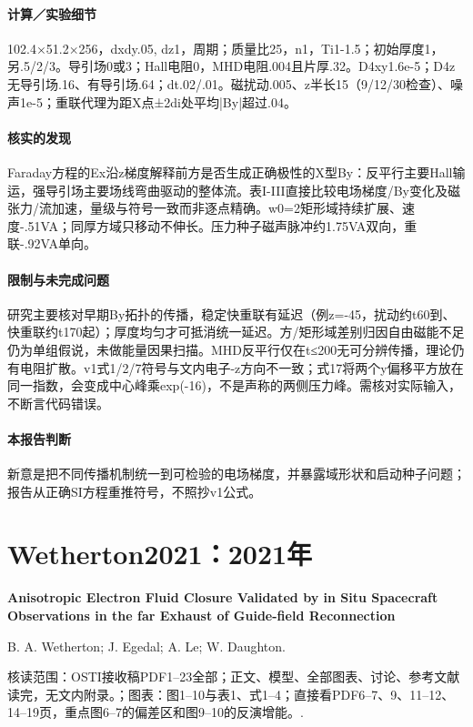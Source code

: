\documentclass[UTF8,a4paper,11pt,openany,fontset=fandol]{ctexbook}
\begin{document}
\paragraph{计算／实验细节}102.4×51.2×256，dxdy.05, dz1，周期；质量比25，n1，Ti1-1.5；初始厚度1，另.5/2/3。导引场0或3；Hall电阻0，MHD电阻.004且片厚.32。D4xy1.6e-5；D4z无导引场.16、有导引场.64；dt.02/.01。磁扰动.005、z半长15（9/12/30检查）、噪声1e-5；重联代理为距X点±2di处平均|By|超过.04。

\paragraph{核实的发现}Faraday方程的Ex沿z梯度解释前方是否生成正确极性的X型By：反平行主要Hall输运，强导引场主要场线弯曲驱动的整体流。表I-III直接比较电场梯度/By变化及磁张力/流加速，量级与符号一致而非逐点精确。w0=2矩形域持续扩展、速度-.51VA；同厚方域只移动不伸长。压力种子磁声脉冲约1.75VA双向，重联-.92VA单向。

\paragraph{限制与未完成问题}研究主要核对早期By拓扑的传播，稳定快重联有延迟（例z=-45，扰动约t60到、快重联约t170起）；厚度均匀才可抵消统一延迟。方/矩形域差别归因自由磁能不足仍为单组假说，未做能量因果扫描。MHD反平行仅在t≤200无可分辨传播，理论仍有电阻扩散。v1式1/2/7符号与文内电子-z方向不一致；式17将两个y偏移平方放在同一指数，会变成中心峰乘exp(-16)，不是声称的两侧压力峰。需核对实际输入，不断言代码错误。

\paragraph{本报告判断}新意是把不同传播机制统一到可检验的电场梯度，并暴露域形状和启动种子问题；报告从正确SI方程重推符号，不照抄v1公式。

\section{Wetherton2021：2021年}\label{paper:Wetherton2021}

\textbf{Anisotropic Electron Fluid Closure Validated by in Situ Spacecraft Observations in the far Exhaust of Guide-field Reconnection}\citep{Wetherton2021}\

B. A. Wetherton;  J. Egedal;  A. Le;  W. Daughton.

\textsf{核读范围：}OSTI接收稿PDF1–23全部；正文、模型、全部图表、讨论、参考文献读完，无文内附录。；\textsf{图表：}图1–10与表1、式1–4；直接看PDF6–7、9、11–12、14–19页，重点图6–7的偏差区和图9–10的反演增能。.
\end{document}
